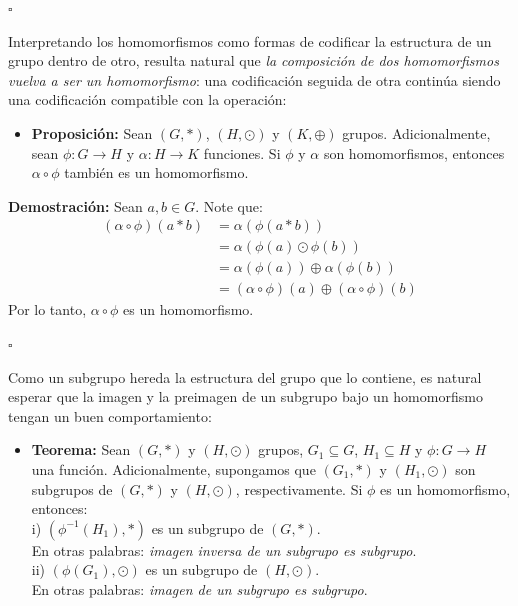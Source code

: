 \documentclass[10 pt]{article}
\begin{document}
\begin{flushright}
    $\square$
\end{flushright}

\Large{Interpretando los homomorfismos como formas de codificar la estructura de un grupo dentro de otro, resulta natural que \textit{la composición de dos homomorfismos vuelva a ser un homomorfismo}: una codificación seguida de otra continúa siendo una codificación compatible con la operación:} \\

\begin{itemize}
    \item \Large{\textbf{Proposición:} Sean $(G,*)$, $(H,\odot)$ y $(K,\oplus)$ grupos. Adicionalmente, sean $\phi:G \rightarrow H$ y $\alpha:H \rightarrow K$ funciones. Si $\phi$ y $\alpha$ son homomorfismos, entonces $\alpha \circ \phi$ también es un homomorfismo.} \\
\end{itemize}

\Large{\textbf{Demostración:} Sean $a,b \in G$. Note que:}
\begin{align*}
    (\alpha \circ \phi)(a*b)&=\alpha(\phi(a*b)) \\
    &=\alpha(\phi(a) \odot \phi(b)) \\
    &=\alpha(\phi(a)) \oplus \alpha(\phi(b)) \\
    &=(\alpha \circ \phi)(a) \oplus (\alpha \circ \phi)(b)
\end{align*}
\Large{Por lo tanto, $\alpha \circ \phi$ es un homomorfismo.} \\

\begin{flushright}
    $\square$
\end{flushright}

\Large{Como un subgrupo hereda la estructura del grupo que lo contiene, es natural esperar que la imagen y la preimagen de un subgrupo bajo un homomorfismo tengan un buen comportamiento:} \\
 
\begin{itemize}
    \item \Large{\textbf{Teorema:} Sean $(G,*)$ y $(H,\odot)$ grupos, $G_1 \subseteq G$, $H_1 \subseteq H$ y $\phi:G \rightarrow H$ una función. Adicionalmente, supongamos que $(G_1,*)$ y $(H_1,\odot)$ son subgrupos de $(G,*)$ y $(H,\odot)$, respectivamente. Si $\phi$ es un homomorfismo, entonces: \\

    i) $(\phi^{-1}(H_1),*)$ es un subgrupo de $(G,*)$. \\

    En otras palabras: \textit{imagen inversa de un subgrupo es subgrupo}. \\

    ii) $(\phi(G_1),\odot)$ es un subgrupo de $(H,\odot)$. \\

    En otras palabras: \textit{imagen de un subgrupo es subgrupo}.} \\
\end{itemize}
\end{document}
